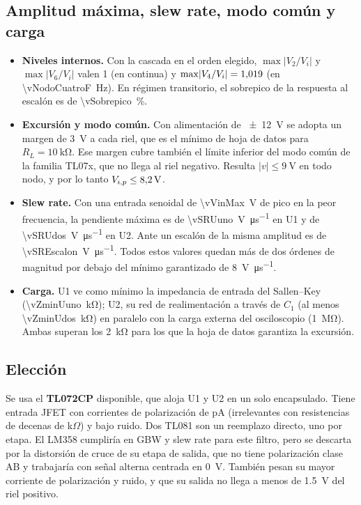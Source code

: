 \subsection{Amplitud máxima, slew rate, modo común y carga}
\begin{itemize}
  \item \textbf{Niveles internos.} Con la cascada en el orden elegido, $\max\lvert V_2/V_i\rvert$ y $\max\lvert V_6/V_i\rvert$ valen 1 (en continua) y
        $\max\lvert V_4/V_i\rvert = \num{1.019}$ (en \qty{\vNodoCuatroF}{\hertz}). En régimen transitorio, el sobrepico de la respuesta
        al escalón es de \qty{\vSobrepico}{\percent}.
  \item \textbf{Excursión y modo común.} Con alimentación de \qty{\pm 12}{\volt} se adopta un margen de \qty{3}{\volt} a cada riel, que es el mínimo
        de hoja de datos para $R_L = \qty{10}{\kilo\ohm}$. Ese margen cubre también el límite inferior del modo común de la familia TL07x, que no
        llega al riel negativo. Resulta $\lvert v\rvert \le \qty{9}{\volt}$ en todo nodo, y por lo tanto $V_{i,p} \le \qty{8.2}{\volt}$.
  \item \textbf{Slew rate.} Con una entrada senoidal de \qty{\vVinMax}{\volt} de pico en la peor frecuencia, la pendiente máxima es de
        \qty{\vSRUuno}{\volt\per\micro\second} en U1 y de \qty{\vSRUdos}{\volt\per\micro\second} en U2. Ante un escalón de la misma amplitud es de
        \qty{\vSREscalon}{\volt\per\micro\second}. Todos estos valores quedan más de dos órdenes de magnitud por debajo del mínimo garantizado de
        \qty{8}{\volt\per\micro\second}.
  \item \textbf{Carga.} U1 ve como mínimo la impedancia de entrada del Sallen--Key (\qty{\vZminUuno}{\kilo\ohm}); U2, su red de realimentación a
        través de $C_1$ (al menos \qty{\vZminUdos}{\kilo\ohm}) en paralelo con la carga externa del osciloscopio (\qty{1}{\mega\ohm}). Ambas superan
        los \qty{2}{\kilo\ohm} para los que la hoja de datos garantiza la excursión.
\end{itemize}

\subsection{Elección}
Se usa el \textbf{TL072CP} disponible, que aloja U1 y U2 en un solo encapsulado. Tiene entrada JFET con corrientes de polarización de pA
(irrelevantes con resistencias de decenas de k$\Omega$) y bajo ruido. Dos TL081 son un reemplazo directo, uno por etapa. El LM358 cumpliría en GBW y
slew rate para este filtro, pero se descarta por la distorsión de cruce de su etapa de salida, que no tiene polarización clase AB y trabajaría con
señal alterna centrada en \qty{0}{\volt}. También pesan su mayor corriente de polarización y ruido, y que su salida no llega a menos de
\qty{1.5}{\volt} del riel positivo.


